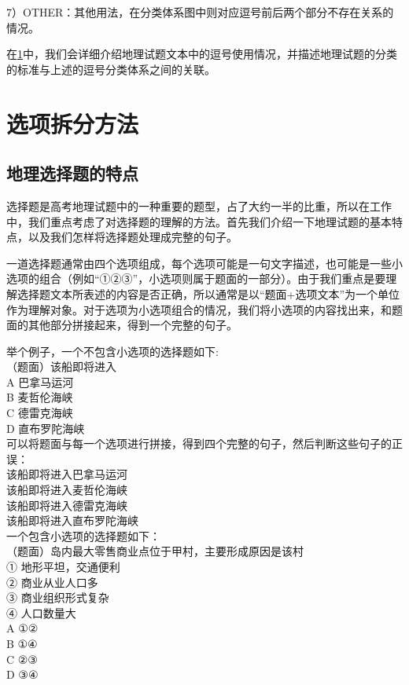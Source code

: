 \documentclass[master, winfont]{njuthesis}
\begin{document}
7）OTHER：其他用法，在分类体系图中则对应逗号前后两个部分不存在关系的情况。

在\ref{section:split_method}中，我们会详细介绍地理试题文本中的逗号使用情况，并描述地理试题的分类的标准与上述的逗号分类体系之间的关联。

\section{选项拆分方法}
\label{section:split_method}
\subsection{地理选择题的特点}
选择题是高考地理试题中的一种重要的题型，占了大约一半的比重，所以在工作中，我们重点考虑了对选择题的理解的方法。首先我们介绍一下地理试题的基本特点，以及我们怎样将选择题处理成完整的句子。

一道选择题通常由四个选项组成，每个选项可能是一句文字描述，也可能是一些小选项的组合（例如“①②③”，小选项则属于题面的一部分）。由于我们重点是要理解选择题文本所表述的内容是否正确，所以通常是以“题面+选项文本”为一个单位作为理解对象。对于选项为小选项组合的情况，我们将小选项的内容找出来，和题面的其他部分拼接起来，得到一个完整的句子。

举个例子，一个不包含小选项的选择题如下:\\
（题面）该船即将进入\\
A 巴拿马运河\\
B 麦哲伦海峡\\
C 德雷克海峡\\
D 直布罗陀海峡\\

可以将题面与每一个选项进行拼接，得到四个完整的句子，然后判断这些句子的正误：\\
该船即将进入巴拿马运河\\
该船即将进入麦哲伦海峡\\
该船即将进入德雷克海峡\\
该船即将进入直布罗陀海峡\\

一个包含小选项的选择题如下：\\
（题面）岛内最大零售商业点位于甲村，主要形成原因是该村 \\
① 地形平坦，交通便利\\
② 商业从业人口多\\
③ 商业组织形式复杂\\
④ 人口数量大\\
A ①②\\
B ①④\\
C ②③\\
D ③④\\
\end{document}
